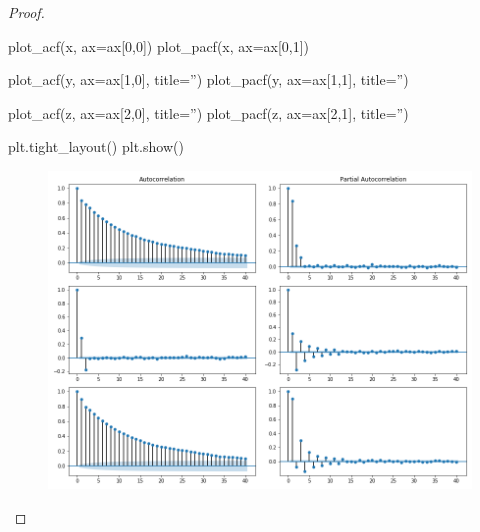 \documentclass[oneside,reqno]{amsart}
\theoremstyle{definition}
\begin{document}
\begin{enumerate}
\begin{proof}
\begin{python3code}
plot_acf(x, ax=ax[0,0]) 
plot_pacf(x, ax=ax[0,1]) 

plot_acf(y, ax=ax[1,0], title='')
plot_pacf(y, ax=ax[1,1], title='')

plot_acf(z, ax=ax[2,0], title='')
plot_pacf(z, ax=ax[2,1], title='')

plt.tight_layout()
plt.show()
\end{python3code}

\begin{figure}
\includegraphics[width=\textwidth]{q4-b}
\caption{}
\label{4b}
\end{figure}
\end{proof}
\end{enumerate}
\end{document}
